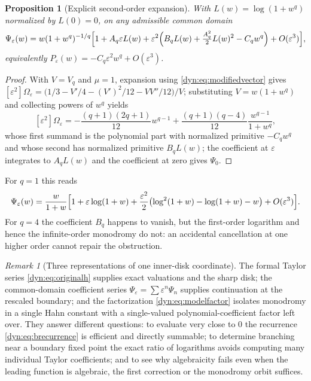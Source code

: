\documentclass[11pt,letterpaper]{article}
\newtheorem{proposition}[proposition]{Proposition}
\theoremstyle{definition}
\theoremstyle{remark}
\newtheorem{remark}[remark]{Remark}
\newcommand{\eps}{\varepsilon}
\numberwithin{equation}{section}
\begin{document}
\begin{proposition}[Explicit second-order expansion]\label{dyn:prop:second}
With $L(w)=\log(1+w^{q})$ normalized by $L(0)=0$, on any admissible common
domain
\begin{equation}\label{dyn:eq:secondorder}
 \Psi_\eps(w)=w(1+w^{q})^{-1/q}\Bigl[1+A_q\eps L(w)
 +\eps^{2}\Bigl(B_qL(w)+\tfrac{A_q^{2}}{2}L(w)^{2}-C_qw^{q}\Bigr)
 +O(\eps^{3})\Bigr],
\end{equation}
equivalently $P_\eps(w)=-C_q\eps^{2}w^{q}+O(\eps^{3})$.
\end{proposition}
\begin{proof}
With $V=V_q$ and $\mu=1$, expansion using
\eqref{dyn:eq:modifiedvector} gives
$[\eps^{2}]\Omega_\eps=\bigl(1/3-V'/4-(V')^{2}/12-VV''/12\bigr)/V$;
substituting $V=w(1+w^{q})$ and collecting powers of $w^{q}$ yields
\[
 [\eps^{2}]\Omega_\eps=-\frac{(q+1)(2q+1)}{12}w^{q-1}
 +\frac{(q+1)(q-4)}{12}\frac{w^{q-1}}{1+w^{q}} ,
\]
whose first summand is the polynomial part with normalized primitive
$-C_qw^{q}$ and whose second has normalized primitive $B_qL(w)$; the
coefficient at $\eps$ integrates to $A_qL(w)$ and the coefficient at zero
gives $\Psi_0$.
\end{proof}

For $q=1$ this reads
\begin{equation}\label{dyn:eq:q1second}
 \Psi_\eps(w)=\frac{w}{1+w}\Bigl[1+\eps\log(1+w)
 +\frac{\eps^{2}}{2}\bigl(\log^{2}(1+w)-\log(1+w)-w\bigr)+O(\eps^{3})\Bigr].
\end{equation}
For $q=4$ the coefficient $B_q$ happens to vanish, but the first-order
logarithm and hence the infinite-order monodromy do not: an accidental
cancellation at one higher order cannot repair the obstruction.

\begin{remark}[Three representations of one inner-disk coordinate]
\label{dyn:rem:threereps}
The formal Taylor series \eqref{dyn:eq:originalh} supplies exact valuations
and the sharp disk; the common-domain coefficient series
$\Psi_\eps=\sum\eps^{n}\Psi_n$ supplies continuation at the rescaled
boundary; and the factorization \eqref{dyn:eq:modelfactor} isolates
monodromy in a single Hahn constant with a single-valued
polynomial-coefficient factor left over. They answer different questions:
to evaluate very close to $0$ the recurrence
\eqref{dyn:eq:brecurrence} is efficient and directly summable; to determine
branching near a boundary fixed point the exact ratio of logarithms avoids
computing many individual Taylor coefficients; and to see why algebraicity
fails even when the leading function is algebraic, the first correction or
the monodromy orbit suffices.
\end{remark}
\end{document}
